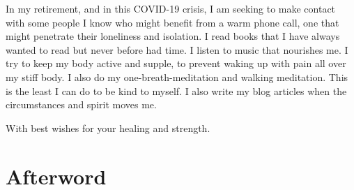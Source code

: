 \documentclass[]{book}
\begin{document}
In my retirement, and in this COVID-19 crisis, I am seeking to make contact with some people I know who might benefit from a warm phone call, one that might penetrate their loneliness and isolation. I read books that I have always wanted to read but never before had time. I listen to music that nourishes me. I try to keep my body active and supple, to prevent waking up with pain all over my stiff body. I also do my one-breath-meditation and walking meditation. This is the least I can do to be kind to myself. I also write my blog articles when the circumstances and spirit moves me.

With best wishes for your healing and strength.

\hypertarget{afterword}{%
\chapter*{Afterword}\label{afterword}}


\end{document}
